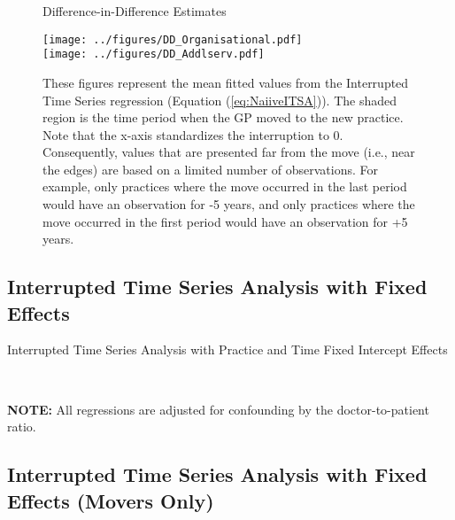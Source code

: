 \documentclass[11pt]{article}
\begin{document}
\begin{figure}[htp]
\centering
\caption{Difference-in-Difference Estimates}
\texttt{[image: ../figures/DD\_Organisational.pdf]}\\
\texttt{[image: ../figures/DD\_Addlserv.pdf]}\\

\caption*{These figures represent the mean fitted values from the Interrupted Time Series regression (Equation (\ref{eq:NaiiveITSA})). The shaded region is the time period when the GP moved to the new practice. Note that the x-axis standardizes the interruption to 0. Consequently, values that are presented far from the move (i.e., near the edges) are based on a limited number of observations. For example, only practices where the move occurred in the last period would have an observation for -5 years, and only practices where the move occurred in the first period would have an observation for +5 years.}
\label{fig:DD2}
\end{figure}


\subsection{Interrupted Time Series Analysis with Fixed Effects}

\begin{landscape}
  \begin{table}[htp]
  \caption{Interrupted Time Series Analysis with Practice and Time Fixed Intercept Effects}
    \begin{threeparttable}
      \\
    \begin{tablenotes}
    \footnotesize
    \textbf{NOTE:} All regressions are adjusted for confounding by the doctor-to-patient ratio.
    \end{tablenotes}
    \end{threeparttable}
    \label{tab:FixedEffectsITSA}
  \end{table}
\end{landscape}




\subsection{Interrupted Time Series Analysis with Fixed Effects (Movers Only)}
\end{document}
